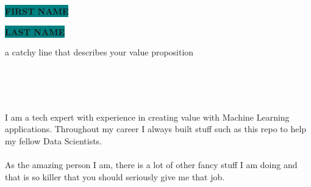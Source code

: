 \documentclass[8pt]{developercv}
\begin{document}
\begin{minipage}[t]{0.725\textwidth} 
	\vspace{-\baselineskip}
	\colorbox{teal}{{\HUGE\textcolor{t4v_white}{\textbf{\MakeUppercase{First Name}}}}}
	
	\colorbox{teal}{{\HUGE\textcolor{t4v_white}{\textbf{\MakeUppercase{Last Name}}}}} 
	
	\vspace{6pt}
	
	{\large a catchy line that describes your value proposition} 
\end{minipage}
\begin{minipage}[t]{0.275\textwidth} 
	\vspace{-\baselineskip}
	\\
	\\
	\\
\end{minipage}

\vspace{0.5cm}



\begin{minipage}[t]{0.4\textwidth} 
	\vspace{-\baselineskip}
	
I am a tech expert with experience in creating value with Machine Learning applications. Throughout my career I always built stuff such as this repo to help my fellow Data Scientists.\\
\\
As the amazing person I am, there is a lot of other fancy stuff I am doing and that is so killer that you should seriously give me that job.
	
\end{minipage}
\hfill 
\begin{minipage}[t]{0.5\textwidth} 
	\vspace{-\baselineskip} 
	\begin{barchart}{5.5}
	\end{barchart}
\end{minipage}
\end{document}
